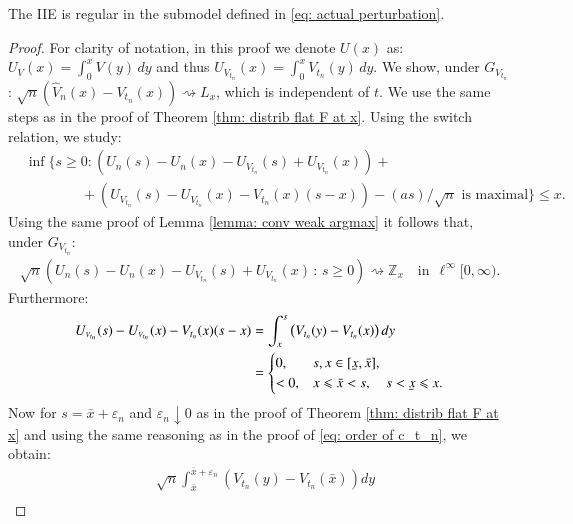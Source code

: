 \begin{lemma}\label{lemma: IIE regular}
    The IIE is regular in the submodel defined in \eqref{eq: actual perturbation}.
\end{lemma}
\begin{proof}
    For clarity of notation, in this proof we denote $U(x)$ as: $U_{\scriptscriptstyle{V}}(x) = \int_0^x V(y) \, dy$ and thus $U_{\scriptscriptstyle{V_{t_n}}}(x) = \int_0^x V_{t_n}(y) \, dy$. We show, under $G_{\scriptscriptstyle{V_{t_n}}}$: $\sqrt{n}(\hat{V}_n (x) - V_{t_n} (x)) \rightsquigarrow L_x$, which is independent of $t$. We use the same steps as in the proof of Theorem \ref{thm: distrib flat F at x}. Using the switch relation, we study: 
    \begin{align*}
        &\inf \big\{s \geq 0: (U_n (s) - U_n(x) - U_{\scriptscriptstyle{V_{t_n}}} (s) + U_{\scriptscriptstyle{V_{t_n}}}(x) ) + \\
    & \quad \quad \quad \quad + (U_{\scriptscriptstyle{V_{t_n}}}(s) - U_{\scriptscriptstyle{V_{t_n}}}(x) - V_{\scriptscriptstyle{t_n}}(x)(s-x) ) -  (a s)/\sqrt{n}  \text { is maximal} \big\} \leq x. 
    \end{align*}
    Using the same proof of Lemma \ref{lemma: conv weak argmax} it follows that, under $G_{\scriptscriptstyle{V_{t_n}}}$:
    \begin{align*}
        \sqrt{n}(U_n (s) - U_n(x) - U_{\scriptscriptstyle{V_{t_n}}} (s) + U_{\scriptscriptstyle{V_{t_n}}}(x) \, : \, s \geq 0) \rightsquigarrow \mathbb{Z}_x \quad \text{in} \: \: \ell^{\infty}[0,\infty).
    \end{align*}
    Furthermore:
    $$
    \begin{aligned}
        U_{\scriptscriptstyle{V_{t_n}}}(s)-U_{\scriptscriptstyle{V_{t_n}}}(x)-V_{t_n}(x)(s-x) & =\int_x^s\left(V_{t_n}(y)-V_{t_n}(x)\right) d y \\
        & = \begin{cases}0, & s, x \in[\ubar{x}, \bar{x}], \\
        <0, & x \leqslant \bar{x}<s, \quad s<\ubar{x} \leqslant x. \end{cases}
    \end{aligned}
    $$
    Now for $s = \bar{x} + \varepsilon_n$ and $\varepsilon_n \downarrow 0$ as in the proof of Theorem \ref{thm: distrib flat F at x} and using the same reasoning as in the proof of \eqref{eq: order of c_t_n}, we obtain:
    \begin{align*}
    &\sqrt{n}\int_{\bar{x}}^{\bar{x}+ \varepsilon_n}\left(V_{t_n}(y)-V_{t_n}(\bar{x})\right) d y \\

\end{align*}
\end{proof}
